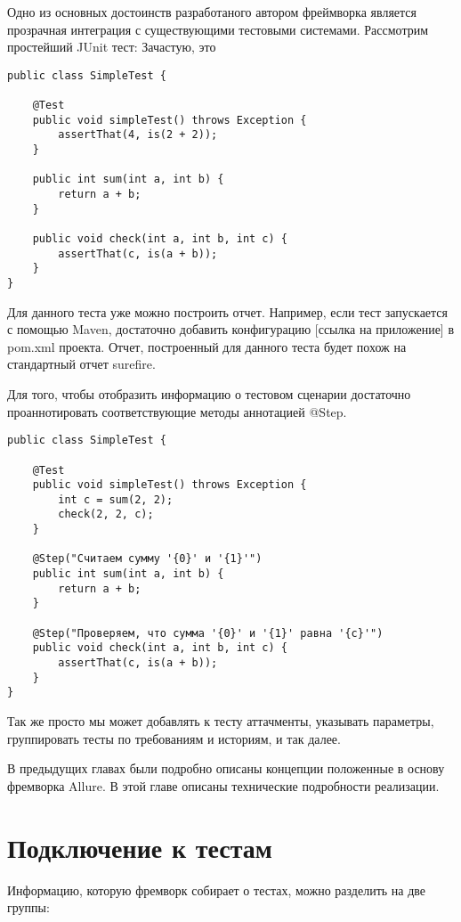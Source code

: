 Одно из основных достоинств разработаного автором фреймворка является прозрачная интеграция с существующими тестовыми системами. Рассмотрим простейший JUnit тест:
Зачастую, это 

 
\begin{lstlisting}
public class SimpleTest {

    @Test
    public void simpleTest() throws Exception {
        assertThat(4, is(2 + 2));
    }
    
    public int sum(int a, int b) {
		return a + b;
	}    
    
    public void check(int a, int b, int c) {
    	assertThat(c, is(a + b));	
    }
}
\end{lstlisting}

Для данного теста уже можно построить отчет. Например, если тест запускается с помощью Maven, достаточно добавить конфигурацию [ссылка на приложение] в pom.xml проекта. Отчет, построенный для данного теста будет похож на стандартный отчет surefire. 

Для того, чтобы отобразить информацию о тестовом сценарии достаточно проаннотировать соответствующие методы аннотацией @Step.

\begin{lstlisting}
public class SimpleTest {

    @Test
    public void simpleTest() throws Exception {
        int c = sum(2, 2);
        check(2, 2, c);
    }
    
    @Step("Считаем сумму '{0}' и '{1}'")
    public int sum(int a, int b) {
		return a + b;
	}    
    
    @Step("Проверяем, что сумма '{0}' и '{1}' равна '{c}'")
    public void check(int a, int b, int c) {
    	assertThat(c, is(a + b));	
    }
}
\end{lstlisting}

Так же просто мы может добавлять к тесту аттачменты, указывать параметры, группировать тесты по требованиям и историям, и так далее.


В предыдущих главах были подробно описаны концепции положенные в основу фремворка Allure. В этой главе
описаны технические подробности реализации.

\section{Подключение к тестам}

Информацию, которую фремворк собирает о тестах, можно разделить на две группы:

